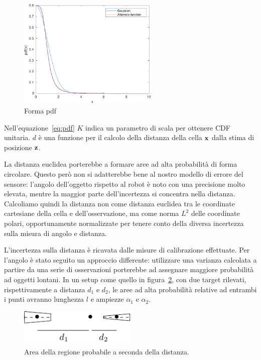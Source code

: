 \documentclass[a4paper]{article}
\begin{document}
	\begin{figure}[H]
		\centering
		\includegraphics[width=0.6\textwidth]{./img/pdf_shape.pdf}
		\caption{Forma pdf}
		\label{fig:pdf_shape}
	\end{figure}

	Nell'equazione~\ref{eq:pdf} $K$ indica un parametro di scala per ottenere
	CDF unitaria. $d$ è una funzione per il calcolo della distanza della cella
	${\bf x}$ dalla stima di posizione ${\bf z}$.

	La distanza euclidea porterebbe a formare aree ad alta probabilità di forma
	circolare. Questo però non si adatterebbe bene al nostro modello di errore
	del sensore: l'angolo dell'oggetto rispetto al robot è noto con una
	precisione molto elevata, mentre la maggior parte dell'incertezza si
	concentra nella distanza. Calcoliamo quindi la distanza non come distanza
	euclidea tra le coordinate cartesiane della cella e dell'osservazione, ma
	come norma $L^2$ delle coordinate polari, opportunamente normalizzate per
	tenere conto della diversa incertezza sulla misura di angolo e distanza.

	L'incertezza sulla distanza è ricavata dalle misure di calibrazione
	effettuate. Per l'angolo è stato seguito un approccio differente:
	utilizzare una varianza calcolata a partire da una serie di osservazioni
	porterebbe ad assegnare maggiore probabilità ad oggetti lontani.  In un
	setup come quello in figura~\ref{fig:circular_sector}, con due target
	rilevati, rispettivamente a distanza $d_1$ e $d_2$, le aree ad alta
	probabilità relative ad entrambi i punti avranno lunghezza $l$ e ampiezze $
	\alpha_1 \text{ e } \alpha_2  $. 
	
	\begin{figure}[H]
		\centering
		\includegraphics[width=0.5\textwidth]{img/circular_sector.pdf}
		\caption{Area della regione probabile a seconda della distanza.}
		\label{fig:circular_sector}
	\end{figure}
\end{document}
